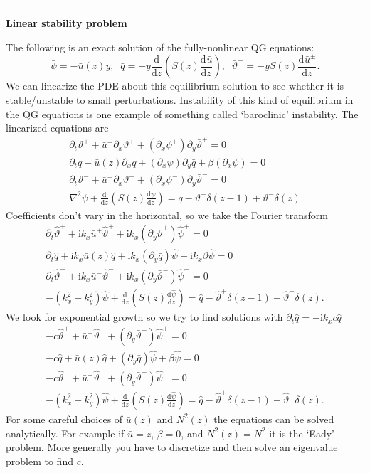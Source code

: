 \documentclass[10pt]{article}
\newcommand{\pd}[1]{\partial_{#1}}
\newcommand{\dd}[3]{\frac{\text{d}^{#3}#1}{\text{d}#2^{#3}}}
\newcommand{\imag}{\text{i}}
\begin{document}
\hrule
\begin{center}{\bf Linear stability problem}\end{center}
The following is an exact solution of the fully-nonlinear QG equations: 
\[\bar\psi = -\bar u(z)y,\;\;\bar q = -y\dd{}{z}{}\left(S(z)\dd{\bar u}{z}{}\right),\;\;\bar\vartheta^\pm = -yS(z)\dd{\bar u^\pm}{z}{}.\]
We can linearize the PDE about this equilibrium solution to see whether it is stable/unstable to small perturbations.
Instability of this kind of equilibrium in the QG equations is one example of something called `baroclinic' instability.
The linearized equations are
\begin{gather}
\pd{t}\vartheta^+ + \bar u^+\pd{x}\vartheta^++(\pd{x}\psi^+)\pd{y}\bar\vartheta^+ = 0\\
\pd{t}q+\bar u(z) \pd{x}q + (\pd{x}\psi)\pd{y}\bar q+\beta (\pd{x}\psi) = 0\\
\pd{t}\vartheta^- + \bar u^-\pd{x}\vartheta^-+(\pd{x}\psi^-)\pd{y}\bar\vartheta^- = 0\\
\nabla^2\psi + \dd{}{z}{}\left(S(z)\dd{\psi}{z}{}\right) = q-\vartheta^+\delta(z-1)+\vartheta^-\delta(z)
\end{gather}
Coefficients don't vary in the horizontal, so we take the Fourier transform
\begin{gather}
\pd{t}\hat{\vartheta}^+ + \imag k_x\bar u^+\hat{\vartheta}^++\imag k_x(\pd{y}\bar\vartheta^+)\hat{\psi}^+ = 0\\
\pd{t}\hat{q}+\imag k_x\bar u(z) \hat{q} + \imag k_x(\pd{y}\bar{q})\hat{\psi}+\imag k_x\beta \hat{\psi} = 0\\
\pd{t}\hat{\vartheta}^- + \imag k_x\bar u^-\hat{\vartheta}^-+\imag k_x(\pd{y}\bar\vartheta^-)\hat{\psi}^- = 0\\
-(k_x^2+k_y^2)\hat{\psi} + \dd{}{z}{}\left(S(z)\dd{\hat{\psi}}{z}{}\right) = \hat{q} -\hat{\vartheta}^+\delta(z-1)+\hat{\vartheta}^-\delta(z).
\end{gather}
We look for exponential growth so we try to find solutions with $\pd{t}\hat{q} = -\imag k_x c\hat{q}$
\begin{gather}
-c\hat{\vartheta}^+ + \bar u^+\hat{\vartheta}^++(\pd{y}\bar\vartheta^+)\hat{\psi}^+ = 0\\
-c\hat{q}+\bar u(z) \hat{q} +(\pd{y}\bar q)\hat{\psi}+\beta \hat{\psi} = 0\\
-c\hat{\vartheta}^- + \bar u^-\hat{\vartheta}^-+(\pd{y}\bar\vartheta^-)\hat{\psi}^- = 0\\
-(k_x^2+k_y^2)\hat{\psi} + \dd{}{z}{}\left(S(z)\dd{\hat{\psi}}{z}{}\right) = \hat{q} -\hat{\vartheta}^+\delta(z-1)+\hat{\vartheta}^-\delta(z).
\end{gather}
For some careful choices of $\bar u(z)$ and $N^2(z)$ the equations can be solved analytically.
For example if $\bar u = z$, $\beta=0$, and $N^2(z) = N^2$ it is the `Eady' problem.
More generally you have to discretize and then solve an eigenvalue problem to find $c$.\\
\end{document}
